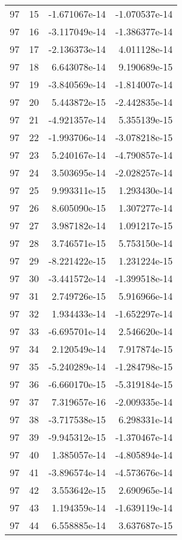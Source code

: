 \begin{tabular}{rrrr}
  97 &   15 & -1.671067e-14 & -1.070537e-14 \\
  97 &   16 & -3.117049e-14 & -1.386377e-14 \\
  97 &   17 & -2.136373e-14 &  4.011128e-14 \\
  97 &   18 &  6.643078e-14 &  9.190689e-15 \\
  97 &   19 & -3.840569e-14 & -1.814007e-14 \\
  97 &   20 &  5.443872e-15 & -2.442835e-14 \\
  97 &   21 & -4.921357e-14 &  5.355139e-15 \\
  97 &   22 & -1.993706e-14 & -3.078218e-15 \\
  97 &   23 &  5.240167e-14 & -4.790857e-14 \\
  97 &   24 &  3.503695e-14 & -2.028257e-14 \\
  97 &   25 &  9.993311e-15 &  1.293430e-14 \\
  97 &   26 &  8.605090e-15 &  1.307277e-14 \\
  97 &   27 &  3.987182e-14 &  1.091217e-15 \\
  97 &   28 &  3.746571e-15 &  5.753150e-14 \\
  97 &   29 & -8.221422e-15 &  1.231224e-15 \\
  97 &   30 & -3.441572e-14 & -1.399518e-14 \\
  97 &   31 &  2.749726e-15 &  5.916966e-14 \\
  97 &   32 &  1.934433e-14 & -1.652297e-14 \\
  97 &   33 & -6.695701e-14 &  2.546620e-14 \\
  97 &   34 &  2.120549e-14 &  7.917874e-15 \\
  97 &   35 & -5.240289e-14 & -1.284798e-15 \\
  97 &   36 & -6.660170e-15 & -5.319184e-15 \\
  97 &   37 &  7.319657e-16 & -2.009335e-14 \\
  97 &   38 & -3.717538e-15 &  6.298331e-14 \\
  97 &   39 & -9.945312e-15 & -1.370467e-14 \\
  97 &   40 &  1.385057e-14 & -4.805894e-14 \\
  97 &   41 & -3.896574e-14 & -4.573676e-14 \\
  97 &   42 &  3.553642e-15 &  2.690965e-14 \\
  97 &   43 &  1.194359e-14 & -1.639119e-14 \\
  97 &   44 &  6.558885e-14 &  3.637687e-15 \\

\end{tabular}
